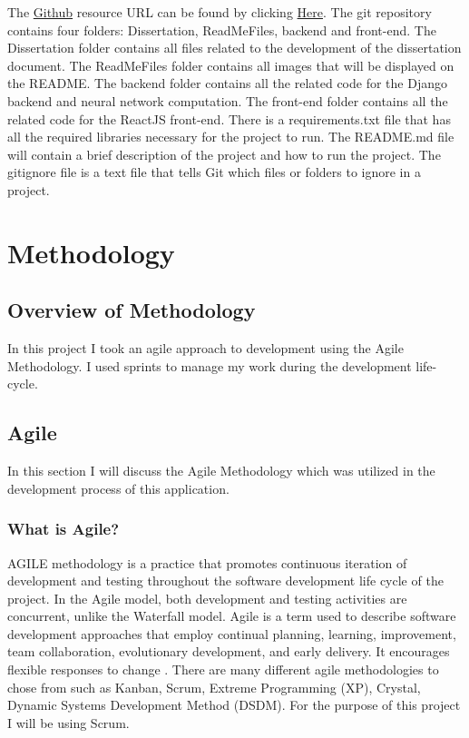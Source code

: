 The \href{https://github.com/MarkReillyGMIT/AppliedProject}{Github} resource URL can be found by clicking \href{https://github.com/MarkReillyGMIT/AppliedProject}{Here}. The git repository contains four folders: Dissertation, ReadMeFiles, backend and front-end. The Dissertation folder contains all files related to the development of the dissertation document. The ReadMeFiles folder contains all images that will be displayed on the README. The backend folder contains all the related code for the Django backend and neural network computation. The front-end folder contains all the related code for the ReactJS front-end. There is a requirements.txt file that has all the required libraries necessary for the project to run. The README.md file will contain a brief description of the project and how to run the project. The gitignore file is a text file that tells Git which files or folders to ignore in a project. 


\chapter{Methodology}

\section{Overview of Methodology}

In this project I took an agile approach to development using the Agile Methodology. I used sprints to manage my work during the development life-cycle.

\section{Agile}
In this section I will discuss the Agile Methodology which was utilized in the development process of this application.

\subsection{What is Agile?}
AGILE methodology is a practice that promotes continuous iteration of development and testing throughout the software development life cycle of the project. In the Agile model, both development and testing activities are concurrent, unlike the Waterfall model\cite{Agile}. Agile is a term used to describe software development approaches that employ continual planning, learning, improvement, team collaboration, evolutionary development, and early delivery. It encourages flexible responses to change \cite{Agile}. There are many different agile methodologies to chose from such as Kanban, Scrum, Extreme Programming (XP), Crystal, Dynamic Systems Development Method (DSDM). For the purpose of this project I will be using Scrum. 

